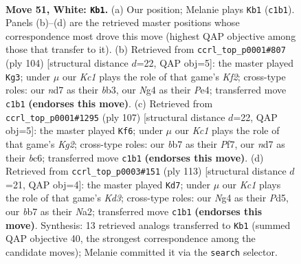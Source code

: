 \documentclass[11pt]{article}
\begin{document}
\clearpage

\begin{figure}[p]\centering
\begin{subfigure}{0.46\textwidth}\centering
\resizebox{\linewidth}{!}{%
\newchessgame
\chessboard[
  setfen={1k6/1b1n4/8/8/p2p2N1/P5P1/1PP5/2K5 w - - 20 51},
  showmover=false,
  pgfstyle=straightmove, color=movearrow, markmove={c1-b1}
]}
\caption{}
\end{subfigure}\hfill
\begin{subfigure}{0.46\textwidth}\centering
\resizebox{\linewidth}{!}{%
\newchessgame
\chessboard[
  setfen={8/5k2/6p1/7p/1B2P2P/1b3P2/5KP1/8 w - - 1 53},
  showmover=false,
  pgfstyle=straightmove, color=movearrow, markmove={f2-g3}
]}
\caption{}
\end{subfigure}
\\[4pt]
\begin{subfigure}{0.46\textwidth}\centering
\resizebox{\linewidth}{!}{%
\newchessgame
\chessboard[
  setfen={5n2/5pk1/2B5/3K3p/6pP/6P1/5P2/8 b - - 6 54},
  showmover=false,
  pgfstyle=straightmove, color=movearrow, markmove={g7-f6}
]}
\caption{}
\end{subfigure}\hfill
\begin{subfigure}{0.46\textwidth}\centering
\resizebox{\linewidth}{!}{%
\newchessgame
\chessboard[
  setfen={8/5p2/3k2p1/3p4/5PP1/4PN2/n2K4/8 b - - 2 57},
  showmover=false,
  pgfstyle=straightmove, color=movearrow, markmove={d6-d7}
]}
\caption{}
\end{subfigure}
\caption{\textbf{Move 51, White: \texttt{Kb1}.} (a) Our position; Melanie plays \texttt{Kb1} (\texttt{c1b1}). Panels (b)--(d) are the retrieved master positions whose correspondence most drove this move (highest QAP objective among those that transfer to it). (b) Retrieved from \texttt{ccrl\_top\_p0001\#807} (ply 104) [structural distance $d$=22, QAP obj=5]: the master played \texttt{Kg3}; under $\mu$ our \emph{Kc1} plays the role of that game's \emph{Kf2}; cross-type roles: our \emph{n}d7 as their \emph{b}b3, our \emph{N}g4 as their \emph{P}e4; transferred move \texttt{c1b1} \textbf{(endorses this move)}. (c) Retrieved from \texttt{ccrl\_top\_p0001\#1295} (ply 107) [structural distance $d$=22, QAP obj=5]: the master played \texttt{Kf6}; under $\mu$ our \emph{Kc1} plays the role of that game's \emph{Kg2}; cross-type roles: our \emph{b}b7 as their \emph{P}f7, our \emph{n}d7 as their \emph{b}c6; transferred move \texttt{c1b1} \textbf{(endorses this move)}. (d) Retrieved from \texttt{ccrl\_top\_p0003\#151} (ply 113) [structural distance $d$=21, QAP obj=4]: the master played \texttt{Kd7}; under $\mu$ our \emph{Kc1} plays the role of that game's \emph{Kd3}; cross-type roles: our \emph{N}g4 as their \emph{P}d5, our \emph{b}b7 as their \emph{N}a2; transferred move \texttt{c1b1} \textbf{(endorses this move)}. Synthesis: 13 retrieved analogs transferred to \texttt{Kb1} (summed QAP objective 40, the strongest correspondence among the candidate moves); Melanie committed it via the \texttt{search} selector.}
\label{fig:thought-m100}
\end{figure}
\end{document}
